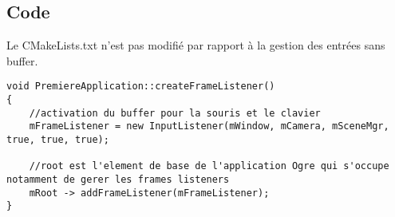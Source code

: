 \subsection{Code}

Le CMakeLists.txt n'est pas modifié par rapport à la gestion des entrées sans buffer.


\begin{lstlisting}[caption={PremiereApplication::createFrameListener()}]
void PremiereApplication::createFrameListener()
{
    //activation du buffer pour la souris et le clavier
    mFrameListener = new InputListener(mWindow, mCamera, mSceneMgr, true, true, true);
    
    //root est l'element de base de l'application Ogre qui s'occupe notamment de gerer les frames listeners
    mRoot -> addFrameListener(mFrameListener);
}

\end{lstlisting}














